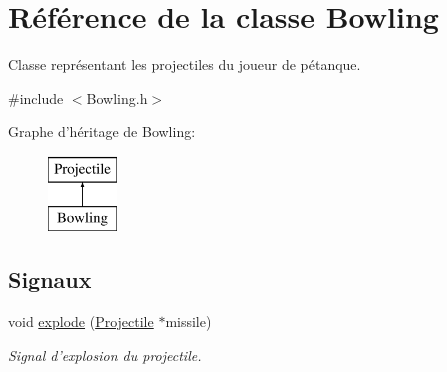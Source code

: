 \hypertarget{classBowling}{
\section{Référence de la classe Bowling}
\label{classBowling}
}


Classe représentant les projectiles du joueur de pétanque.  




{\ttfamily \#include $<$Bowling.h$>$}

Graphe d'héritage de Bowling:\begin{figure}[H]
\begin{center}
\leavevmode
\includegraphics[height=2.000000cm]{classBowling}
\end{center}
\end{figure}
\subsection*{Signaux}
\begin{DoxyCompactItemize}
\item 
void \hyperlink{classProjectile_a18d1fccd74f92b54f239c13c74cbc00c}{explode} (\hyperlink{classProjectile}{Projectile} $\ast$missile)
\begin{DoxyCompactList}\small\item\em Signal d'explosion du projectile. \end{DoxyCompactList}\end{DoxyCompactItemize}
